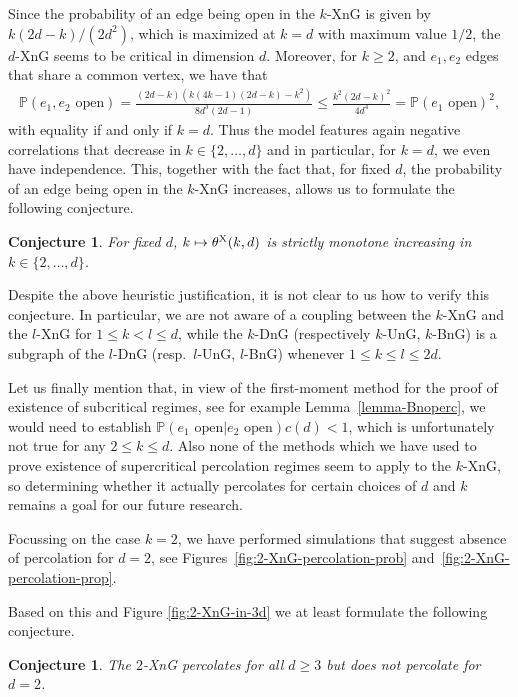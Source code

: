 \documentclass[a4paper, oneside, 11pt]{amsart}
\newtheorem{conj}[theorem]{Conjecture}
\theoremstyle{definition}
\renewcommand{\P}{\mathbb{P}}
\newcommand{\1}{\mathbbm{1}}
\newcommand{\0}{\mathbf{o}}
\newcommand*{\be}{\begin{equation}}
\newcommand*{\ee}{\end{equation}}
\newcommand*{\ba}{\begin{aligned}}
\newcommand*{\ea}{\end{aligned}}
\numberwithin{equation}{section}
\begin{document}
Since the probability of an edge being open 
in the $k$-XnG is given by $k(2d-k)/(2d^2)$, which is maximized at $k=d$ with maximum value $1/2$, the $d$-XnG seems to be critical in dimension $d$. Moreover, for $k\ge 2$, and $e_1, e_2$ edges that share a common vertex, we have that 
\be\ba 
\P(e_1,e_2\text{ open})=\frac{(2d-k)(k(4k-1)(2d-k)-k^2)}{8d^3(2d-1)}\leq \frac{k^2(2d-k)^2}{4d^4}=\P(e_1\text{ open})^2,
\ea \ee
with equality if and only if $k=d$. Thus the model features again negative correlations that decrease in $k\in\{2,\dots,d\}$ and in particular, for $k=d$, we even have independence. This, together with the fact that, for fixed $d$, the probability of an edge being open in the $k$-XnG increases, allows us to formulate the following conjecture.
\begin{conj}
For fixed $d$, $k \mapsto \theta^{\rm X}(k,d)$ is strictly monotone increasing in $k\in\{2,\dots,d\}$.
\end{conj}
Despite the above heuristic justification, it is not clear to us how to verify this conjecture. In particular, we are not aware of a coupling between the $k$-XnG and the $l$-XnG for $1 \leq k < l \leq d$, while the $k$-DnG (respectively $k$-UnG, $k$-BnG) is a subgraph of the $l$-DnG (resp.\ $l$-UnG, $l$-BnG) whenever $1 \leq k \leq l \leq 2d$.

Let us finally mention that, in view of the first-moment method for the proof of existence of subcritical regimes, see for example Lemma~\ref{lemma-Bnoperc}, we would need to establish $\P(e_1\text{ open}|e_2\text{ open})c(d)<1$, which is unfortunately not true for any $2\le k\le d$. Also none of the methods which we have used to prove existence of supercritical percolation regimes seem to apply to the $k$-XnG, so determining whether it actually percolates for certain choices of $d$ and $k$ remains a goal for our future research. 

Focussing on the case $k=2$, we have performed simulations that suggest absence of percolation for $d=2$, see Figures~\ref{fig:2-XnG-percolation-prob} and~\ref{fig:2-XnG-percolation-prop}. 

Based on this and Figure \ref{fig:2-XnG-in-3d} we at least formulate the following conjecture.
\begin{conj}
    The $2$-XnG percolates for all $d\geq 3$ but does not percolate for $d=2$. 
\end{conj}
\end{document}

